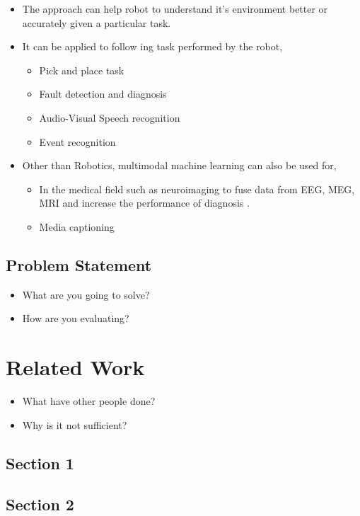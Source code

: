 \documentclass[rnd]{mas_proposal}
\begin{document}
\begin{itemize}
    \item The approach can help robot to understand it's environment better or accurately given a particular task.
	\item It can be applied to follow ing task performed by the robot,
	\begin{itemize}
		\item Pick and place task
		\item Fault detection and diagnosis
		\item Audio-Visual Speech recognition
		\item Event recognition
	\end{itemize}
	\item Other than Robotics, multimodal machine learning can also be used for,
	\begin{itemize}
		\item In the medical field such as neuroimaging to fuse data from EEG, MEG, MRI and increase the performance of diagnosis \cite{Daehne2015}.
		\item Media captioning
	\end{itemize}
\end{itemize}

\section{Problem Statement}
\begin{itemize}
    \item What are you going to solve?
    \item How are you evaluating?
\end{itemize}


\chapter{Related Work}
\begin{itemize}
    \item What have other people done?
    \item Why is it not sufficient?
\end{itemize}

\section{Section 1}
\section{Section 2}
\end{document}
